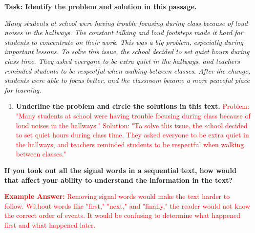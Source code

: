 \documentclass[12pt]{article}
\begin{document}
\vspace{1em}

\begin{tcolorbox}[colframe=black!60, colback=white, 
coltitle=black, colbacktitle=black!15, fonttitle=\bfseries\Large, 
title=Independent Practice 1: Problem and Solution, halign title=center, left=10pt, right=10pt, top=10pt, bottom=15pt]

\textbf{Task: Identify the problem and solution in this passage.}

\textit{Many students at school were having trouble focusing during class because of loud noises in the hallways. The constant talking and loud footsteps made it hard for students to concentrate on their work. This was a big problem, especially during important lessons. To solve this issue, the school decided to set quiet hours during class time. They asked everyone to be extra quiet in the hallways, and teachers reminded students to be respectful when walking between classes. After the change, students were able to focus better, and the classroom became a more peaceful place for learning.}

\begin{enumerate}
    \item \textbf{Underline the problem and circle the solutions in this text.}  
    \textcolor{red}{Problem: "Many students at school were having trouble focusing during class because of loud noises in the hallways."}  
    \textcolor{red}{Solution: "To solve this issue, the school decided to set quiet hours during class time. They asked everyone to be extra quiet in the hallways, and teachers reminded students to be respectful when walking between classes."}
\end{enumerate}
\end{tcolorbox}

\vspace{1em}

\begin{tcolorbox}[colframe=black!60, colback=white, 
coltitle=black, colbacktitle=black!15, fonttitle=\bfseries\Large, 
title=Exit Ticket, halign title=center, left=10pt, right=10pt, top=10pt, bottom=15pt]
\textbf{If you took out all the signal words in a sequential text, how would that affect your ability to understand the information in the text?}  

\textcolor{red}{\textbf{Example Answer:} Removing signal words would make the text harder to follow. Without words like "first," "next," and "finally," the reader would not know the correct order of events. It would be confusing to determine what happened first and what happened later.}
\end{tcolorbox}
\end{document}
